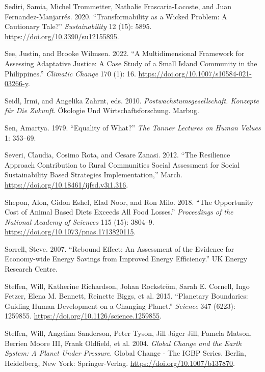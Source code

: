 \documentclass[
  a4paper,
  openany]{book}
\newlength{\cslhangindent}
\newenvironment{CSLReferences}[2] %
 {\begin{list}{}{%
  \setlength{\itemindent}{0pt}
  \setlength{\leftmargin}{0pt}
  \setlength{\parsep}{0pt}
  \ifodd #1
   \setlength{\leftmargin}{\cslhangindent}
   \setlength{\itemindent}{-1\cslhangindent}
  \fi
  \setlength{\itemsep}{#2\baselineskip}}}
 {\end{list}}
\begin{document}
\begin{CSLReferences}{1}{0}
Sediri, Samia, Michel Trommetter, Nathalie Frascaria-Lacoste, and Juan
Fernandez-Manjarrés. 2020. {``Transformability as a {Wicked Problem}: {A
Cautionary Tale}?''} \emph{Sustainability} 12 (15): 5895.
\url{https://doi.org/10.3390/su12155895}.

See, Justin, and Brooke Wilmsen. 2022. {``A Multidimensional Framework
for Assessing Adaptative Justice: A Case Study of a Small Island
Community in the {Philippines}.''} \emph{Climatic Change} 170 (1): 16.
\url{https://doi.org/10.1007/s10584-021-03266-y}.

Seidl, Irmi, and Angelika Zahrnt, eds. 2010.
\emph{Postwachstumsgesellschaft. {Konzepte} f{ü}r Die {Zukunft}}.
{Ö}kologie Und {Wirtschaftsforschung}. Marbug.

Sen, Amartya. 1979. {``Equality of {What}?''} \emph{The Tanner Lectures
on Human Values} 1: 353--69.

Severi, Claudia, Cosimo Rota, and Cesare Zanasi. 2012. {``The
{Resilience Approach Contribution} to {Rural Communities Social
Assessment} for {Social Sustainability Based Strategies
Implementation},''} March.
\url{https://doi.org/10.18461/ijfsd.v3i1.316}.

Shepon, Alon, Gidon Eshel, Elad Noor, and Ron Milo. 2018. {``The
Opportunity Cost of Animal Based Diets Exceeds All Food Losses.''}
\emph{Proceedings of the National Academy of Sciences} 115 (15):
3804--9. \url{https://doi.org/10.1073/pnas.1713820115}.

Sorrell, Steve. 2007. {``Rebound {Effect}: {An Assessment} of the
{Evidence} for {Economy-wide Energy Savings} from {Improved Energy
Efficiency}.''} UK Energy Research Centre.

Steffen, Will, Katherine Richardson, Johan Rockström, Sarah E. Cornell,
Ingo Fetzer, Elena M. Bennett, Reinette Biggs, et al. 2015. {``Planetary
Boundaries: {Guiding} Human Development on a Changing Planet.''}
\emph{Science} 347 (6223): 1259855.
\url{https://doi.org/10.1126/science.1259855}.

Steffen, Will, Angelina Sanderson, Peter Tyson, Jill Jäger Jill, Pamela
Matson, Berrien Moore III, Frank Oldfield, et al. 2004. \emph{Global
{Change} and the {Earth System}: {A Planet Under Pressure}}. Global
{Change} - {The IGBP Series}. Berlin, Heidelberg, New York:
Springer-Verlag. \url{https://doi.org/10.1007/b137870}.


\end{CSLReferences}
\end{document}
